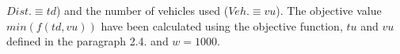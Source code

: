 \begin{itemize}
\begin{math}
Dist. \equiv td\end{math}) and the number of vehicles used (\begin{math}Veh. \equiv vu\end{math}). The objective value \begin{math} min(f(td,vu)) \end{math} have been calculated using the objective function, \begin{math} tu \end{math} and \begin{math} vu \end{math} defined in the paragraph 2.4. and \begin{math} w = 1000 \end{math}.
\end{itemize}
\newpage
